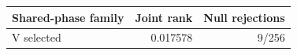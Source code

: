 \begin{tabular}{lrr}\toprule Shared-phase family & Joint rank & Null rejections\\\midrule
V selected & 0.017578 & 9/256\\
\bottomrule\end{tabular}
